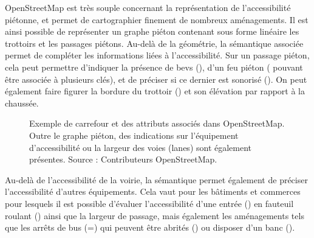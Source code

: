 
OpenStreetMap est très souple concernant la représentation de l'accessibilité piétonne, et permet de cartographier finement de nombreux aménagements. Il est ainsi possible de représenter un graphe piéton contenant sous forme linéaire les trottoirs et les passages piétons. Au-delà de la géométrie, la sémantique associée permet de compléter les informations liées à l'accessibilité. Sur un passage piéton, cela peut permettre d'indiquer la présence de \glspl{bev} (), d'un feu piéton ( pouvant être associée à plusieurs clés), et de préciser si ce dernier est sonorisé (). On peut également faire figurer la bordure du trottoir () et son élévation par rapport à la chaussée.

\begin{figure}
    \centering
    \caption[Anatomie d'un carrefour dans OSM.]{Exemple de carrefour et des attributs associés dans OpenStreetMap. Outre le graphe piéton, des indications sur l'équipement d'accessibilité ou la largeur des voies (lanes) sont également présentes. Source : Contributeurs OpenStreetMap.}
    \label{fig:modelisation_anatomie_carrefour_osm}
\end{figure}

Au-delà de l'accessibilité de la voirie, la sémantique permet également de préciser l'accessibilité d'autres équipements. Cela vaut pour les bâtiments et commerces pour lesquels il est possible d'évaluer l'accessibilité d'une entrée () en fauteuil roulant () ainsi que la largeur de passage, mais également les aménagements tels que les arrêts de bus (=) qui peuvent être abrités () ou disposer d'un banc ().

